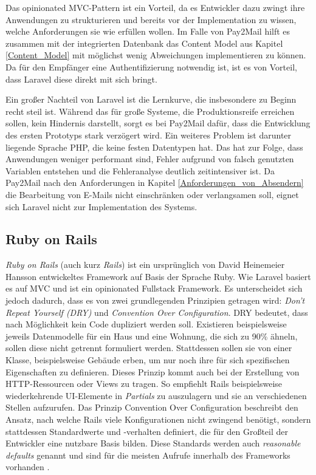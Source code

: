 Das opinionated MVC-Pattern ist ein Vorteil, da es Entwickler dazu zwingt ihre Anwendungen zu strukturieren und bereits vor der Implementation zu wissen, welche Anforderungen sie wie erfüllen wollen. Im Falle von Pay2Mail hilft es zusammen mit der integrierten Datenbank das Content Model aus Kapitel \ref{Content_Model} mit möglichst wenig Abweichungen implementieren zu können. Da für den Empfänger eine Authentifizierung notwendig ist, ist es von Vorteil, dass Laravel diese direkt mit sich bringt.

Ein großer Nachteil von Laravel ist die Lernkurve, die insbesondere zu Beginn recht steil ist. Während das für große Systeme, die Produktionsreife erreichen sollen, kein Hindernis darstellt, sorgt es bei Pay2Mail dafür, dass die Entwicklung des ersten Prototyps stark verzögert wird. Ein weiteres Problem ist darunter liegende Sprache PHP, die keine festen Datentypen hat. Das hat zur Folge, dass Anwendungen weniger performant sind, Fehler aufgrund von falsch genutzten Variablen entstehen und die Fehleranalyse deutlich zeitintensiver ist. Da Pay2Mail nach den Anforderungen in Kapitel \ref{Anforderungen_von_Absendern} die Bearbeitung von E-Mails nicht einschränken oder verlangsamen soll, eignet sich Laravel nicht zur Implementation des Systems.


\subsection{Ruby on Rails}
\label{Ruby_on_Rails}

\textit{Ruby on Rails} (auch kurz \textit{Rails}) ist ein ursprünglich von David Heinemeier Hansson entwickeltes Framework auf Basis der Sprache Ruby. Wie Laravel basiert es auf MVC und ist ein opinionated Fullstack Framework. Es unterscheidet sich jedoch dadurch, dass es von zwei grundlegenden Prinzipien getragen wird: \textit{Don't Repeat Yourself (DRY)} und \textit{Convention Over Configuration}. DRY bedeutet, dass nach Möglichkeit kein Code dupliziert werden soll. Existieren beispielsweise jeweils Datenmodelle für ein Haus und eine Wohnung, die sich zu 90\% ähneln, sollen diese nicht getrennt formuliert werden. Stattdessen sollen sie von einer Klasse, beispielsweise Gebäude erben, um nur noch ihre für sich spezifischen Eigenschaften zu definieren. Dieses Prinzip kommt auch bei der Erstellung von HTTP-Ressourcen oder Views zu tragen. So empfiehlt Rails beispielsweise wiederkehrende UI-Elemente in \textit{Partials} zu auszulagern und sie an verschiedenen Stellen aufzurufen. Das Prinzip Convention Over Configuration beschreibt den Ansatz, nach welche Rails viele Konfigurationen nicht zwingend benötigt, sondern stattdessen Standardwerte und -verhalten definiert, die für den Großteil der Entwickler eine nutzbare Basis bilden. Diese Standards werden auch \textit{reasonable defaults} genannt und sind für die meisten Aufrufe innerhalb des Frameworks vorhanden \citep{Hansson2022a}.

